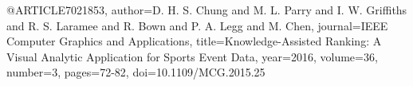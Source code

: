 @ARTICLE{7021853,
  author={D. H. S. {Chung} and M. L. {Parry} and I. W. {Griffiths} and R. S. {Laramee} and R. {Bown} and P. A. {Legg} and M. {Chen}},
  journal={IEEE Computer Graphics and Applications}, 
  title={Knowledge-Assisted Ranking: A Visual Analytic Application for Sports Event Data}, 
  year={2016},
  volume={36},
  number={3},
  pages={72-82},
  doi={10.1109/MCG.2015.25}}